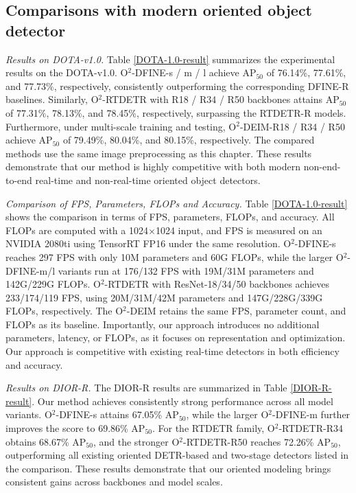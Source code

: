 \documentclass[lettersize,journal]{IEEEtran}
\begin{document}
\subsection{Comparisons with modern oriented object detector}

\DIORRResults

\TableDOTAVonefiveResult



\textit{Results on DOTA-v1.0.}
Table \ref{DOTA-1.0-result} summarizes the experimental results on the DOTA-v1.0. O$^2$-DFINE-s / m / l achieve AP$_{50}$ of 76.14\%, 77.61\%, and 77.73\%, respectively, consistently outperforming the corresponding DFINE-R baselines. Similarly, O$^2$-RTDETR with R18 / R34 / R50 backbones attains AP$_{50}$ of 77.31\%, 78.13\%, and 78.45\%, respectively, surpassing the RTDETR-R models. Furthermore, under multi-scale training and testing, O$^2$-DEIM-R18 / R34 / R50 achieve AP$_{50}$ of 79.49\%, 80.04\%, and 80.15\%, respectively. The compared methods use the same image preprocessing as this chapter. These results demonstrate that our method is highly competitive with both modern non-end-to-end real-time and non-real-time oriented object detectors.


\textit{Comparison of FPS, Parameters, FLOPs and Accuracy.}
Table \ref{DOTA-1.0-result} shows the comparison in terms of FPS, parameters, FLOPs, and accuracy. All FLOPs are computed with a 1024$\times$1024 input, and FPS is measured on an NVIDIA \textcolor[HTML]{76B900}{} 2080ti using TensorRT FP16 under the same resolution. O$^2$-DFINE-s reaches 297 FPS with only 10M parameters and 60G FLOPs, while the larger O$^2$-DFINE-m/l variants run at 176/132 FPS with 19M/31M parameters and 142G/229G FLOPs. O$^2$-RTDETR with ResNet-18/34/50 backbones achieves 233/174/119 FPS, using 20M/31M/42M parameters and 147G/228G/339G FLOPs, respectively. The O$^2$-DEIM retains the same FPS, parameter count, and FLOPs as its baseline. Importantly, our approach introduces no additional parameters, latency, or FLOPs, as it focuses on representation and optimization. Our approach is competitive with existing real-time detectors in both efficiency and accuracy.

\TableFAIRResult

\textit{Results on DIOR-R.}
The DIOR-R results are summarized in Table \ref{DIOR-R-result}. Our method achieves consistently strong performance across all model variants. O$^2$-DFINE-s attains 67.05\% AP$_{50}$, while the larger O$^2$-DFINE-m further improves the score to 69.86\% AP$_{50}$. For the RTDETR family, O$^2$-RTDETR-R34 obtains 68.67\% AP$_{50}$, and the stronger O$^2$-RTDETR-R50 reaches 72.26\% AP$_{50}$, outperforming all existing oriented DETR-based and two-stage detectors listed in the comparison. These results demonstrate that our oriented modeling brings consistent gains across backbones and model scales.
\end{document}
